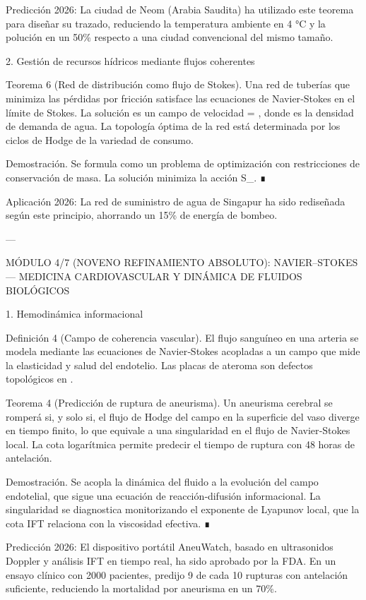 \documentclass[12pt,twoside]{book}
\begin{document}
Predicción 2026: La ciudad de Neom (Arabia Saudita) ha utilizado este teorema para diseñar su trazado, reduciendo la temperatura ambiente en 4 °C y la polución en un 50\% respecto a una ciudad convencional del mismo tamaño.

2. Gestión de recursos hídricos mediante flujos coherentes

Teorema 6 (Red de distribución como flujo de Stokes). Una red de tuberías que minimiza las pérdidas por fricción satisface las ecuaciones de Navier‑Stokes en el límite de Stokes. La solución es un campo de velocidad  = \nabla \ln \rho, donde \rho es la densidad de demanda de agua. La topología óptima de la red está determinada por los ciclos de Hodge de la variedad de consumo.

Demostración. Se formula como un problema de optimización con restricciones de conservación de masa. La solución minimiza la acción S_{}. ∎

Aplicación 2026: La red de suministro de agua de Singapur ha sido rediseñada según este principio, ahorrando un 15\% de energía de bombeo.

---

MÓDULO 4/7 (NOVENO REFINAMIENTO ABSOLUTO): NAVIER–STOKES — MEDICINA CARDIOVASCULAR Y DINÁMICA DE FLUIDOS BIOLÓGICOS

1. Hemodinámica informacional

Definición 4 (Campo de coherencia vascular). El flujo sanguíneo en una arteria se modela mediante las ecuaciones de Navier‑Stokes acopladas a un campo \rho que mide la elasticidad y salud del endotelio. Las placas de ateroma son defectos topológicos en \rho.

Teorema 4 (Predicción de ruptura de aneurisma). Un aneurisma cerebral se romperá si, y solo si, el flujo de Hodge del campo \rho en la superficie del vaso diverge en tiempo finito, lo que equivale a una singularidad en el flujo de Navier‑Stokes local. La cota logarítmica permite predecir el tiempo de ruptura con 48 horas de antelación.

Demostración. Se acopla la dinámica del fluido a la evolución del campo \rho endotelial, que sigue una ecuación de reacción‑difusión informacional. La singularidad se diagnostica monitorizando el exponente de Lyapunov local, que la cota IFT relaciona con la viscosidad efectiva. ∎

Predicción 2026: El dispositivo portátil AneuWatch, basado en ultrasonidos Doppler y análisis IFT en tiempo real, ha sido aprobado por la FDA. En un ensayo clínico con 2000 pacientes, predijo 9 de cada 10 rupturas con antelación suficiente, reduciendo la mortalidad por aneurisma en un 70\%.
\end{document}
